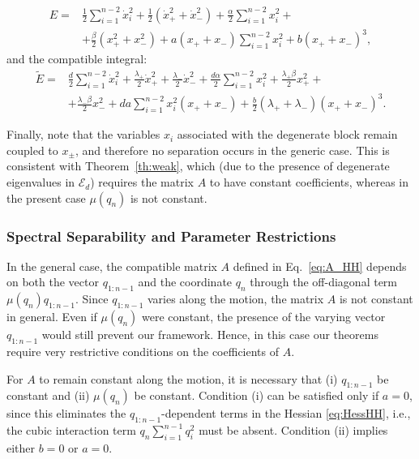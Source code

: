 \documentclass{rendiconti}
\begin{document}
\begin{equation}
\begin{aligned}
E ={}& \frac{1}{2} \sum_{i=1}^{n-2} \dot{x}_i^2
+ \frac{1}{2} (\dot{x}_+^2 + \dot{x}_-^2)
+ \frac{\alpha}{2} \sum_{i=1}^{n-2} x_i^2 +\\
&+ \frac{\beta}{2} (x_+^2 + x_-^2)
+ a (x_+ + x_-) \sum_{i=1}^{n-2} x_i^2
+ b (x_+ + x_-)^3,
\end{aligned}
\end{equation}
and the compatible integral:
\begin{equation}
\begin{aligned}
\tilde{E} ={}& \frac{d}{2} \sum_{i=1}^{n-2}  \dot{x}_i^2
+ \frac{\lambda_+}{2} \dot{x}_+^2
+ \frac{\lambda_-}{2} \dot{x}_-^2
+ \frac{d\alpha}{2} \sum_{i=1}^{n-2} x_i^2 + \frac{\lambda_+ \beta}{2} x_+^2+\\
&
+ \frac{\lambda_- \beta}{2} x_-^2
+ d a \sum_{i=1}^{n-2} x_i^2 (x_+ + x_-)
+ \frac{b}{2}(\lambda_+ + \lambda_-) (x_+ + x_-)^3.
\end{aligned}
\end{equation}

Finally, note that the variables $x_i$ associated with the degenerate block
remain coupled to $x_\pm$, and therefore no separation occurs in the generic
case. This is consistent with Theorem~\ref{th:weak}, which (due to the presence
of degenerate eigenvalues in $\mathcal{E}_d$) requires the matrix $A$ to have constant
coefficients, whereas in the present case $\mu(q_n)$ is not constant.
%
\subsubsection{Spectral Separability and Parameter Restrictions}
%
In the general case, the compatible matrix $A$ defined in Eq.~\eqref{eq:A_HH}
depends on both the vector $q_{1:n-1}$ and the coordinate $q_n$ through the
off-diagonal term $\mu(q_n) q_{1:n-1}$.
Since $q_{1:n-1}$ varies along the motion, the matrix $A$ is not constant in
general. Even if $\mu(q_n)$ were constant, the presence of the varying vector $q_{1:n-1}$ would
still prevent our framework. Hence, in this case our theorems
require very restrictive conditions on the coefficients of $A$.

For $A$ to remain constant along the motion, it is necessary that
(i) $q_{1:n-1}$ be constant and (ii) $\mu(q_n)$ be constant.
Condition (i) can be satisfied only if $a=0$, since this eliminates the
$q_{1:n-1}$-dependent terms in the Hessian \eqref{eq:HessHH}, i.e., the cubic
interaction term $q_n \sum_{i=1}^{n-1} q_i^2$ must be absent.
Condition (ii) implies either $b=0$ or $a=0$.
\end{document}
